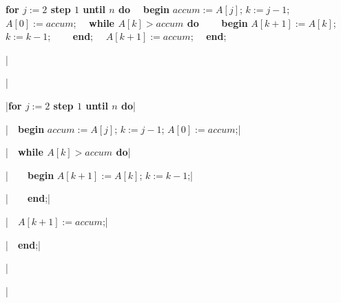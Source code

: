 

\bigskip


{\obeylines 
{\bf for $j := 2$ step $1$ until $n$ do}
\ \ {\bf begin} $accum := A[j]$; $k := j - 1$; $A[0] := accum$;
\ \ {\bf while $A[k] > accum$ do}
\ \ \ \ {\bf begin} $A[k + 1] := A[k]$; $k := k - 1$;
\ \ \ \ {\bf end};
\ \ $A[k + 1] := accum$;
\ \ {\bf end};
}

\bigskip

\respuestaS

|{\obeylines|

|{\bf for $j := 2$ step $1$ until $n$ do}|

|\ \ {\bf begin} $accum := A[j]$; $k := j - 1$; $A[0] := accum$;|

|\ \ {\bf while $A[k] > accum$ do}|

|\ \ \ \ {\bf begin} $A[k + 1] := A[k]$; $k := k - 1$;|

|\ \ \ \ {\bf end};|

|\ \ $A[k + 1] := accum$;|

|\ \ {\bf end};|

|}|

\bye


